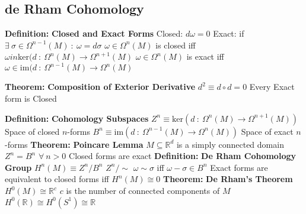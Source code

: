 \documentclass[14pt]{extarticle}
\def\Definition{{\color{blue} \textbf{Definition:} }}
\def\Theorem{{\color{red} \textbf{Theorem:} }}
\begin{document}
\begin{outline}
	\section*{de Rham Cohomology}
		\1	\Definition \textbf{Closed and Exact Forms}
			\2	Closed: $d\omega = 0$
			\2	Exact: if $\exists~\sigma \in \Omega^{n-1}(M)~:~\omega = d\sigma$
			\2	$\omega \in \Omega^n(M)$ is closed iff $\omega in \text{ker}(d~:~\Omega^n(M) \rightarrow \Omega^{n+1}(M)$
			\2	$\omega \in \Omega^n(M)$ is exact iff $\omega \in \text{im}(d~:~\Omega^{n-1}(M) \rightarrow \Omega^n(M)$

		\1	\Theorem \textbf{Composition of Exterior Derivative}
			\2	$d^2 \equiv d \circ d = 0$
			\2	Every Exact form is Closed
		
		\1	\Definition \textbf{Cohomology Subspaces}
			\2	$Z^n \equiv \text{ker}(d~:~\Omega^n(M) \rightarrow \Omega^{n+1}(M))$
				\3	Space of closed $n$-forms
			\2	$B^n \equiv \text{im}(d~:~\Omega^{n-1}(M) \rightarrow \Omega^n(M))$
				\3	Space of exact $n$-forms
		\1	\Theorem \textbf{Poincare Lemma}
			\2	$M \subseteq \mathbb{R}^d$ is a simply connected domain
			\2	$Z^n = B^n$ $\forall~n > 0$
			\2	Closed forms are exact
		\1	\Definition \textbf{De Rham Cohomology Group}
			\2	$H^n(M) \equiv Z^n / B^n$
      \2	$Z^n / \sim$
				\3	$\omega \sim \sigma$ iff $\omega - \sigma \in B^n$
			\2	Exact forms are equivalent to closed forms iff
					$H^n(M) \cong 0$
		\1	\Theorem \textbf{De Rham's Theorem}
			\2	$H^0(M) \cong \mathbb{R}^c$
			\2	$c$ is the number of connected components of $M$
			\2	$H^0(\mathbb{R}) \cong H^0(S^1) \cong \mathbb{R}$

\end{outline}
\end{document}
